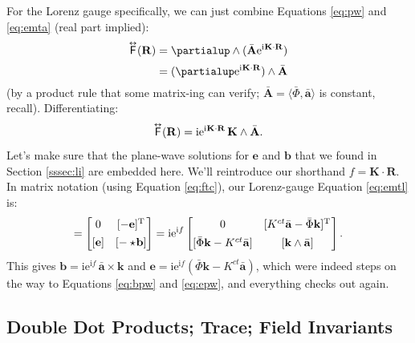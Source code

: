 \documentclass[12pt]{article}
\renewcommand{\vv}[1]{\mathbf{#1}}
\newcommand{\capdy}[1]{ \overset{ \text{\tiny$\bm\leftrightarrow$} }{\vphantom{\text{\small{A}}}\smash{#1}} }
\begin{document}
For the Lorenz gauge specifically, we can just combine Equations \ref{eq:pw} and \ref{eq:emta} (real part implied):
\begin{equation*}
\begin{split}
\capdy{\mathsf{F}} (\vv R) &= \partialup \wedge (  \bar{\vv A} \mathrm{e}^{\mathrm{i} \mkern.5mu \vv K \cdot \vv R} ) \\[2pt]
&= ( \partialup \mathrm{e}^{\mathrm{i} \mkern.5mu \vv K \cdot \vv R} ) \wedge \bar{\vv A}
\end{split}
\end{equation*}
(by a product rule that some matrix-ing can verify; $\bar{\vv A} = \langle \bar{\Phi}, \bar{\vv a} \rangle$ is constant, recall). Differentiating:
\begin{equation}\label{eq:emtl}
\capdy{\mathsf{F}} (\vv R) = \mathrm{i} \mathrm{e}^{\mathrm{i} \mkern.5mu \vv K \cdot \vv R} \, \vv K \wedge \bar{\vv A} .
\end{equation}
Let's make sure that the plane-wave solutions for $\vv e$ and $\vv b$ that we found in Section \ref{sssec:li} are embedded here. We'll reintroduce our shorthand $f = \vv K \cdot \vv R$. In matrix notation (using Equation \ref{eq:ftc}), our Lorenz-gauge Equation \ref{eq:emtl} is:
\begin{equation*}
[ \capdy{\mathsf{F}} ]
=
\begin{bmatrix}
0 & [ - \vv e]^\mathrm{T} \\[1ex]
[\vv e] & [ - \star \mkern-3mu \vv b ]
\end{bmatrix}
=
\mathrm{i} \mathrm{e}^{\mathrm{i} f}
\begin{bmatrix}
0 & [K^{ct} \bar{\vv a} - \bar{\Phi} \vv k ]^\mathrm{T} \mkern1mu \\[1ex]
[\bar{\Phi} \vv k - K^{ct} \bar{\vv a}] & [ \vv k \wedge \bar{\vv a} ] 
\end{bmatrix} .
\end{equation*}
This gives $\vv b = \mathrm{i} \mathrm{e}^{\mathrm{i} f} \, \bar{\vv a} \times \vv k$ and $\vv e = \mathrm{i} \mathrm{e}^{\mathrm{i} f} ( \bar{\Phi} \vv k - K^{ct} \bar{\vv a} )$, which were indeed steps on the way to Equations \ref{eq:bpw} and \ref{eq:epw}, and everything checks out again.


\subsection{Double Dot Products; Trace; Field Invariants}\label{ssec:dd}
\end{document}
